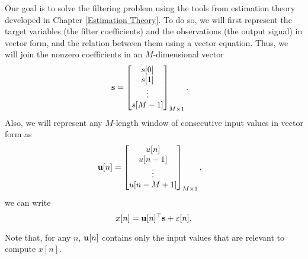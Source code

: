 Our goal is to solve the filtering problem using the tools from estimation theory developed in Chapter \ref{Estimation Theory}. To do so, we will first represent the target variables (the filter coefficients) and the observations (the output signal) in vector form, and the relation between them using a vector equation. Thus, we will join the nonzero coefficients in an $M$-dimensional vector
\begin{align}
{\mathbf s} &= \begin{bmatrix}
		s[0] \\ s[1] \\ \vdots \\ s[M-1]
      \end{bmatrix}_{M\times 1}.
\end{align}
Also, we will represent any $M$-length window of consecutive input values in vector form as
\begin{align}
{\mathbf u}[n] &= \begin{bmatrix}
   	    	  u[n] \\ u[n-1] \\ \vdots \\ u[n-M+1]
          \end{bmatrix}_{M\times 1},
\end{align}
we can write
\begin{equation}
\label{eq:signal_model}
x[n] = {\mathbf u}[n]^\top {\mathbf s} + \varepsilon[n].
\end{equation}

Note that, for any $n$, ${\mathbf u}[n]$ contains only the input values that are relevant to compute $x[n]$.


